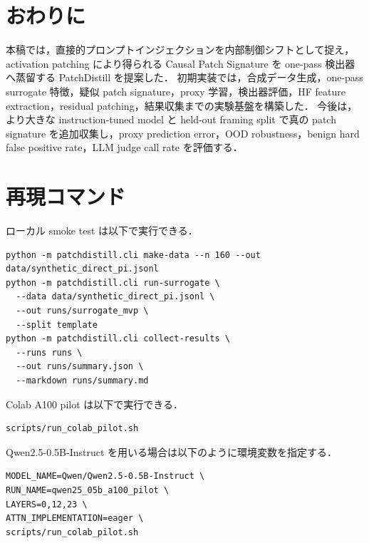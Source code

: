 \documentclass[11pt,a4paper]{ltjsarticle}
\begin{document}
\section{おわりに}
本稿では，直接的プロンプトインジェクションを内部制御シフトとして捉え，activation patching により得られる Causal Patch Signature を one-pass 検出器へ蒸留する PatchDistill を提案した．
初期実装では，合成データ生成，one-pass surrogate 特徴，疑似 patch signature，proxy 学習，検出器評価，HF feature extraction，residual patching，結果収集までの実験基盤を構築した．
今後は，より大きな instruction-tuned model と held-out framing split で真の patch signature を追加収集し，proxy prediction error，OOD robustness，benign hard false positive rate，LLM judge call rate を評価する．




\appendix
\section{再現コマンド}
ローカル smoke test は以下で実行できる．
\begin{verbatim}
python -m patchdistill.cli make-data --n 160 --out data/synthetic_direct_pi.jsonl
python -m patchdistill.cli run-surrogate \
  --data data/synthetic_direct_pi.jsonl \
  --out runs/surrogate_mvp \
  --split template
python -m patchdistill.cli collect-results \
  --runs runs \
  --out runs/summary.json \
  --markdown runs/summary.md
\end{verbatim}

Colab A100 pilot は以下で実行できる．
\begin{verbatim}
scripts/run_colab_pilot.sh
\end{verbatim}

Qwen2.5-0.5B-Instruct を用いる場合は以下のように環境変数を指定する．
\begin{verbatim}
MODEL_NAME=Qwen/Qwen2.5-0.5B-Instruct \
RUN_NAME=qwen25_05b_a100_pilot \
LAYERS=0,12,23 \
ATTN_IMPLEMENTATION=eager \
scripts/run_colab_pilot.sh
\end{verbatim}
\end{document}
